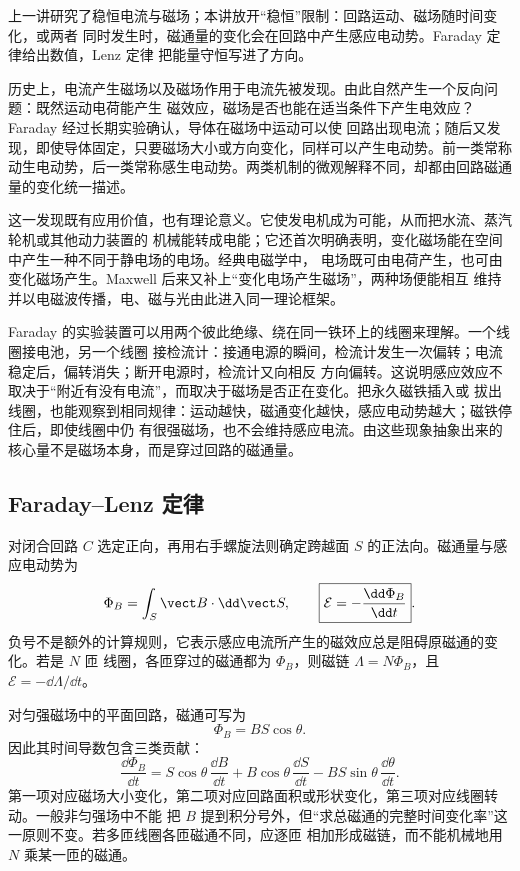 上一讲研究了稳恒电流与磁场；本讲放开“稳恒”限制：回路运动、磁场随时间变化，或两者
同时发生时，磁通量的变化会在回路中产生感应电动势。Faraday 定律给出数值，Lenz 定律
把能量守恒写进了方向。

历史上，电流产生磁场以及磁场作用于电流先被发现。由此自然产生一个反向问题：既然运动电荷能产生
磁效应，磁场是否也能在适当条件下产生电效应？Faraday 经过长期实验确认，导体在磁场中运动可以使
回路出现电流；随后又发现，即使导体固定，只要磁场大小或方向变化，同样可以产生电动势。前一类常称
动生电动势，后一类常称感生电动势。两类机制的微观解释不同，却都由回路磁通量的变化统一描述。

这一发现既有应用价值，也有理论意义。它使发电机成为可能，从而把水流、蒸汽轮机或其他动力装置的
机械能转成电能；它还首次明确表明，变化磁场能在空间中产生一种不同于静电场的电场。经典电磁学中，
电场既可由电荷产生，也可由变化磁场产生。Maxwell 后来又补上“变化电场产生磁场”，两种场便能相互
维持并以电磁波传播，电、磁与光由此进入同一理论框架。

Faraday 的实验装置可以用两个彼此绝缘、绕在同一铁环上的线圈来理解。一个线圈接电池，另一个线圈
接检流计：接通电源的瞬间，检流计发生一次偏转；电流稳定后，偏转消失；断开电源时，检流计又向相反
方向偏转。这说明感应效应不取决于“附近有没有电流”，而取决于磁场是否正在变化。把永久磁铁插入或
拔出线圈，也能观察到相同规律：运动越快，磁通变化越快，感应电动势越大；磁铁停住后，即使线圈中仍
有很强磁场，也不会维持感应电流。由这些现象抽象出来的核心量不是磁场本身，而是穿过回路的磁通量。

\faradayHistoryContext

\subsection*{Faraday--Lenz 定律}

对闭合回路 $C$ 选定正向，再用右手螺旋法则确定跨越面 $S$ 的正法向。磁通量与感应电动势为
\begin{equation}
  \Phi_B=\int_S\vect B\cdot\dd\vect S,
  \qquad
  \boxed{\mathcal E=-\frac{\dd\Phi_B}{\dd t}}.
\end{equation}
负号不是额外的计算规则，它表示感应电流所产生的磁效应总是阻碍原磁通的变化。若是 $N$ 匝
线圈，各匝穿过的磁通都为 $\Phi_B$，则磁链 $\Lambda=N\Phi_B$，且 $\mathcal E=-\dd\Lambda/\dd t$。

对匀强磁场中的平面回路，磁通可写为
\begin{equation}
  \Phi_B=BS\cos\theta.
\end{equation}
因此其时间导数包含三类贡献：
\begin{equation}
 \frac{\dd\Phi_B}{\dd t}
 =S\cos\theta\,\frac{\dd B}{\dd t}
 +B\cos\theta\,\frac{\dd S}{\dd t}
 -BS\sin\theta\,\frac{\dd\theta}{\dd t}.
\end{equation}
第一项对应磁场大小变化，第二项对应回路面积或形状变化，第三项对应线圈转动。一般非匀强场中不能
把 $B$ 提到积分号外，但“求总磁通的完整时间变化率”这一原则不变。若多匝线圈各匝磁通不同，应逐匝
相加形成磁链，而不能机械地用 $N$ 乘某一匝的磁通。


